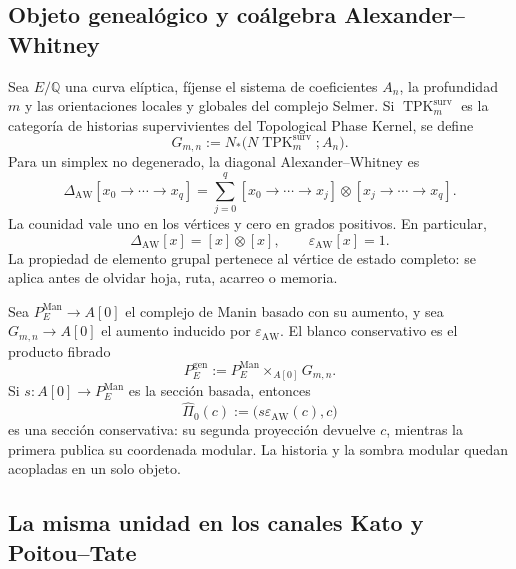 \subsection*{Objeto genealógico y coálgebra Alexander--Whitney}

Sea \(E/\mathbb Q\) una curva elíptica, fíjense el sistema de coeficientes
\(A_n\), la profundidad \(m\) y las orientaciones locales y globales del
complejo Selmer. Si
\(\operatorname{TPK}^{\mathrm{surv}}_{m}\) es la categoría de historias
supervivientes del Topological Phase Kernel, se define
\begin{equation}\label{eq:bsd-suc-gmn}
 G_{m,n}:=
 N_{*}\bigl(N\operatorname{TPK}^{\mathrm{surv}}_{m};A_n\bigr).
\end{equation}
Para un simplex no degenerado, la diagonal Alexander--Whitney es
\begin{equation}\label{eq:bsd-suc-aw}
 \Delta_{\mathrm{AW}}[x_0\to\cdots\to x_q]
 =\sum_{j=0}^{q}
 [x_0\to\cdots\to x_j]\otimes
 [x_j\to\cdots\to x_q].
\end{equation}
La counidad vale uno en los vértices y cero en grados positivos. En
particular,
\begin{equation}\label{eq:bsd-suc-group-like}
 \Delta_{\mathrm{AW}}[x]=[x]\otimes[x],
 \qquad \varepsilon_{\mathrm{AW}}[x]=1.
\end{equation}
La propiedad de elemento grupal pertenece al vértice de estado completo: se aplica
antes de olvidar hoja, ruta, acarreo o memoria.

Sea \(P_E^{\mathrm{Man}}\to A[0]\) el complejo de Manin basado con su
aumento, y sea \(G_{m,n}\to A[0]\) el aumento inducido por
\(\varepsilon_{\mathrm{AW}}\). El blanco conservativo es el producto
fibrado
\begin{equation}\label{eq:bsd-suc-pullback}
 P_E^{\mathrm{gen}}
 :=P_E^{\mathrm{Man}}\times_{A[0]}G_{m,n}.
\end{equation}
Si \(s:A[0]\to P_E^{\mathrm{Man}}\) es la sección basada, entonces
\begin{equation}\label{eq:bsd-suc-section}
 \widehat\Pi_0(c)
 :=\bigl(s\varepsilon_{\mathrm{AW}}(c),c\bigr)
\end{equation}
es una sección conservativa: su segunda proyección devuelve \(c\), mientras
la primera publica su coordenada modular. La historia y la sombra modular
quedan acopladas en un solo objeto.

\subsection*{La misma unidad en los canales Kato y Poitou--Tate}


